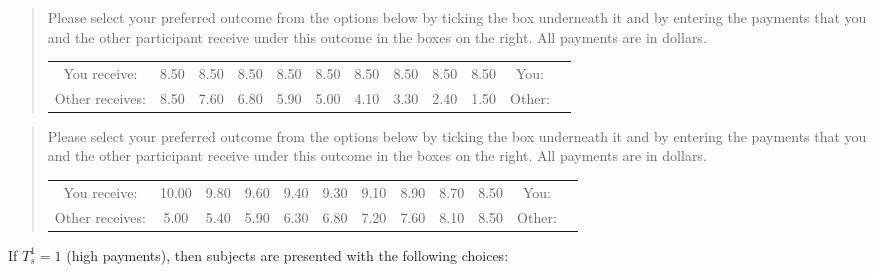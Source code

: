 \documentclass[11pt]{article}
\begin{document}
\begin{tcolorbox}
\begin{quote}
\begin{center}
Please select your preferred outcome from the options below by ticking the box underneath it and by entering the payments that you and the other participant receive under this outcome in the boxes on the right. All payments are in dollars.\\

\begin{tabular}{c|c|c|c|c|c|c|c|c|c|c|c|}
\cline{2-12}You receive: & 8.50 &	8.50&	8.50&	8.50	&8.50&	8.50	&8.50&	8.50&	8.50 & You:& \\ 
Other receives: &8.50	&7.60&	6.80	&5.90	&5.00	&4.10&	3.30	&2.40	&1.50 &Other: & \\ \cline{2-12}
\end{tabular}
\end{center}
\end{quote}
\end{tcolorbox}

\begin{tcolorbox}
\begin{quote}
\begin{center}
Please select your preferred outcome from the options below by ticking the box underneath it and by entering the payments that you and the other participant receive under this outcome in the boxes on the right. All payments are in dollars.\\

\begin{tabular}{c|c|c|c|c|c|c|c|c|c|c|c|}
\cline{2-12} You receive: & 10.00	&9.80	&9.60&	9.40&	9.30&	9.10&	8.90&	8.70&	8.50 & You:& \\ 
Other receives: &5.00	&5.40	&5.90&	6.30&	6.80&	7.20	&7.60&	8.10&	8.50 &Other: & \\ \cline{2-12}
\end{tabular}
\end{center}
\end{quote}
\end{tcolorbox}

If $T_s^1=1$ (high payments), then subjects are presented with the following choices: 								
\end{document}

